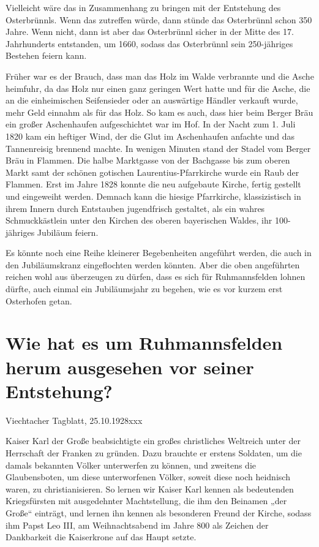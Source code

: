 \documentclass[12pt,a4paper]{book}
\begin{document}
Vielleicht wäre das in Zusammenhang zu bringen mit der Entstehung des
Osterbrünnls. Wenn das zutreffen würde, dann stünde das Osterbrünnl schon 350
Jahre. Wenn nicht, dann ist aber das Osterbrünnl sicher in der Mitte des 17.
Jahrhunderts entstanden, um 1660, sodass das Osterbrünnl sein 250-jähriges
Bestehen feiern kann.

Früher war es der Brauch, dass man das Holz im Walde verbrannte und die Asche
heimfuhr, da das Holz nur einen ganz geringen Wert hatte und für die Asche, die
an die einheimischen Seifensieder oder an auswärtige Händler verkauft wurde,
mehr Geld einnahm als für das Holz. So kam es auch, dass hier beim Berger Bräu
ein großer Aschenhaufen aufgeschichtet war im Hof. In der Nacht zum 1. Juli 1820
kam ein heftiger Wind, der die Glut im Aschenhaufen anfachte und das
Tannenreisig brennend machte. In wenigen Minuten stand der Stadel vom Berger
Bräu in Flammen. Die halbe Marktgasse von der Bachgasse bis zum oberen Markt
samt der schönen gotischen Laurentius-Pfarrkirche wurde ein Raub der Flammen.
Erst im Jahre 1828 konnte die neu aufgebaute Kirche, fertig gestellt und
eingeweiht werden. Demnach kann die hiesige Pfarrkirche, klassizistisch in ihrem
Innern durch Entstauben jugendfrisch gestaltet, als ein wahres Schmuckkästlein
unter den Kirchen des oberen bayerischen Waldes, ihr 100-jähriges Jubiläum
feiern.

Es könnte noch eine Reihe kleinerer Begebenheiten angeführt werden, die auch in
den Jubiläumskranz eingeflochten werden könnten. Aber die oben angeführten
reichen wohl aus überzeugen zu dürfen, dass es sich für Ruhmannsfelden lohnen
dürfte, auch einmal ein Jubiläumsjahr zu begehen, wie es vor kurzem erst
Osterhofen getan.

\part{Wie hat es um Ruhmannsfelden herum ausgesehen vor seiner Entstehung?}

Viechtacher Tagblatt, 25.10.1928xxx

Kaiser Karl der Große beabsichtigte ein großes christliches Weltreich unter der
Herrschaft der Franken zu gründen. Dazu brauchte er erstens Soldaten, um die
damals bekannten Völker unterwerfen zu können, und zweitens die Glaubensboten,
um diese unterworfenen Völker, soweit diese noch heidnisch waren, zu
christianisieren. So lernen wir Kaiser Karl kennen als bedeutenden Kriegsfürsten
mit ausgedehnter Machtstellung, die ihm den Beinamen „der Große“ einträgt, und
lernen ihn kennen als besonderen Freund der Kirche, sodass ihm Papst Leo III, am
Weihnachtsabend im Jahre 800 als Zeichen der Dankbarkeit die Kaiserkrone auf das
Haupt setzte.
\end{document}
